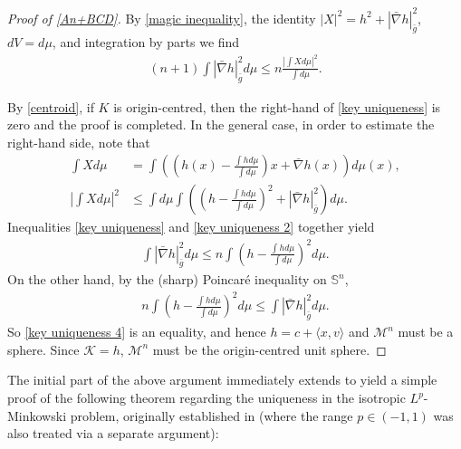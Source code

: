 \documentclass[12pt]{amsart}
\theoremstyle{definition}
\numberwithin{equation}{section}
\newcommand{\M}{\mathcal{M}}
\theoremstyle{remark}
\numberwithin{equation}{section}
\begin{document}
\begin{proof}[Proof of \autoref{An+BCD}]By \autoref{magic inequality}, the identity $|X|^2=h^2+|\bar{\nabla} h|_{\bar{g}}^2$, $dV=d\mu$,  and integration by parts  we find
\begin{align}\label{key uniqueness}
(n+1)\int |\bar{\nabla} h|_{\bar{g}}^2d\mu\leq n \frac{\left|\int Xd\mu\right|^2}{\int d\mu}.
\end{align}

By \autoref{centroid}, if $K$ is origin-centred, then the right-hand of \eqref{key uniqueness} is zero and the proof is completed. In the general case, in order to estimate the right-hand side, note that
\begin{align}\label{key uniqueness 2}
\int Xd\mu&=\int \left ( (h(x)-\frac{\int hd\mu}{\int d\mu})x+\bar{\nabla}h(x) \right ) d\mu(x),\nonumber\\
\left|\int Xd\mu\right|^2&\leq\int d\mu \int \left ( (h-\frac{\int hd\mu}{\int d\mu})^2+ |\bar{\nabla}h|_{\bar{g}}^2 \right ) d\mu.
\end{align}
Inequalities \eqref{key uniqueness} and \eqref{key uniqueness 2} together yield
\begin{align*}
\int|\bar{\nabla} h|_{\bar{g}}^2d\mu\leq n\int (h-\frac{\int hd\mu}{\int d\mu})^2d\mu.
\end{align*}
On the other hand, by the  (sharp) Poincar\'{e} inequality on $\mathbb{S}^n$,
\begin{align}\label{key uniqueness 4}
n\int (h-\frac{\int hd\mu}{\int d\mu})^2d\mu\leq \int|\bar{\nabla} h|_{\bar{g}}^2d\mu.
\end{align}
So \eqref{key uniqueness 4} is an equality,  and hence $h = c + \langle x,v \rangle$ and $\M^n$ must be a sphere. Since $\mathcal{K} = h$, $\M^n$ must be the origin-centred unit sphere. 
\end{proof}

The initial part of the above argument immediately extends to yield a simple proof of the following theorem regarding the uniqueness in the isotropic $L^p$-Minkowski problem, originally established in \cite{BCD17} (where the range $p \in (-1,1)$ was also treated via a separate argument):
\end{document}
